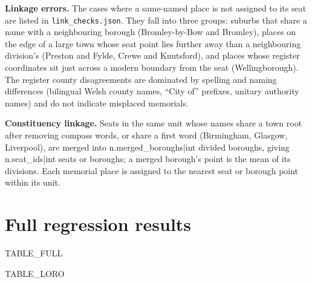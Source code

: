 \documentclass[11pt,a4paper]{article}
\begin{document}
\textbf{Linkage errors.} The cases where a same-named place is not assigned to its seat are listed in \texttt{link\_checks.json}. They fall into three groups: suburbs that share a name with a neighbouring borough (Bromley-by-Bow and Bromley), places on the edge of a large town whose seat point lies further away than a neighbouring division's (Preston and Fylde, Crewe and Knutsford), and places whose register coordinates sit just across a modern boundary from the seat (Wellingborough). The register county disagreements are dominated by spelling and naming differences (bilingual Welsh county names, ``City of'' prefixes, unitary authority names) and do not indicate misplaced memorials.

\textbf{Constituency linkage.} Seats in the same unit whose names share a town root after removing compass words, or share a first word (Birmingham, Glasgow, Liverpool), are merged into {{n.merged_boroughs|int}} divided boroughs, giving {{n.seat_ids|int}} seats or boroughs; a merged borough's point is the mean of its divisions. Each memorial place is assigned to the nearest seat or borough point within its unit.

\section{Full regression results}
{{TABLE_FULL}}

{{TABLE_LORO}}
\end{document}
